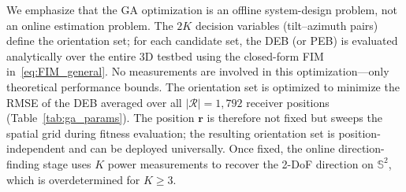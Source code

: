 \documentclass[journal]{IEEEtran}
\newcommand{\added}[1]{{\color{blue}#1}}
\begin{document}
\added{We emphasize that the GA optimization is an offline system-design problem, not an online estimation problem. The $2K$ decision variables (tilt--azimuth pairs) define the orientation set; for each candidate set, the DEB (or PEB) is evaluated analytically over the entire 3D testbed using the closed-form FIM in~\eqref{eq:FIM_general}. No measurements are involved in this optimization---only theoretical performance bounds. The orientation set is optimized to minimize the RMSE of the DEB averaged over all $|\mathcal{R}|=1{,}792$ receiver positions (Table~\ref{tab:ga_params}). The position $\mathbf{r}$ is therefore not fixed but sweeps the spatial grid during fitness evaluation; the resulting orientation set is position-independent and can be deployed universally. Once fixed, the online direction-finding stage uses $K$ power measurements to recover the 2-DoF direction on $\mathbb{S}^2$, which is overdetermined for $K\ge3$.}
\end{document}
